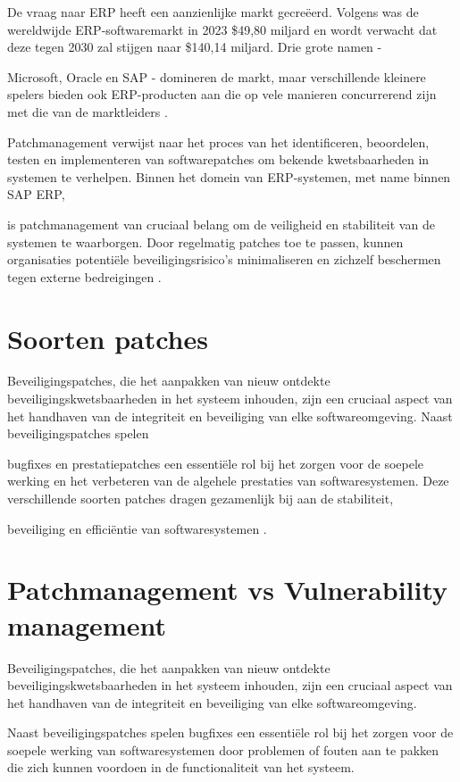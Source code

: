 De vraag naar ERP heeft een aanzienlijke markt gecreëerd. Volgens \textcite{Madh2024} was de wereldwijde ERP-softwaremarkt in 2023 \$49,80 miljard en wordt verwacht dat deze tegen 2030 zal stijgen naar \$140,14 miljard. Drie grote namen - 

Microsoft, Oracle en SAP - domineren de markt, maar verschillende kleinere spelers bieden ook ERP-producten aan die op vele manieren concurrerend zijn met die van de marktleiders \autocite{Pratt2023}.

Patchmanagement verwijst naar het proces van het identificeren, beoordelen, testen en implementeren van softwarepatches om bekende kwetsbaarheden in systemen te verhelpen. Binnen het domein van ERP-systemen, met name binnen SAP ERP,

is patchmanagement van cruciaal belang om de veiligheid en stabiliteit van de systemen te waarborgen. Door regelmatig patches toe te passen, kunnen organisaties potentiële beveiligingsrisico's minimaliseren en zichzelf beschermen tegen externe bedreigingen \autocite{Buenning2024}.

\section{Soorten patches}
Beveiligingspatches, die het aanpakken van nieuw ontdekte beveiligingskwetsbaarheden in het systeem inhouden, zijn een cruciaal aspect van het handhaven van de integriteit en beveiliging van elke softwareomgeving. Naast beveiligingspatches spelen

bugfixes en prestatiepatches een essentiële rol bij het zorgen voor de soepele werking en het verbeteren van de algehele prestaties van softwaresystemen. Deze verschillende soorten patches dragen gezamenlijk bij aan de stabiliteit, 

beveiliging en efficiëntie van softwaresystemen \autocite{Wrobel2023}.

\section{Patchmanagement vs Vulnerability management}
Beveiligingspatches, die het aanpakken van nieuw ontdekte beveiligingskwetsbaarheden in het systeem inhouden, zijn een cruciaal aspect van het handhaven van de integriteit en beveiliging van elke softwareomgeving.

Naast beveiligingspatches spelen bugfixes een essentiële rol bij het zorgen voor de soepele werking van softwaresystemen door problemen of fouten aan te pakken die zich kunnen voordoen in de functionaliteit van het systeem.


